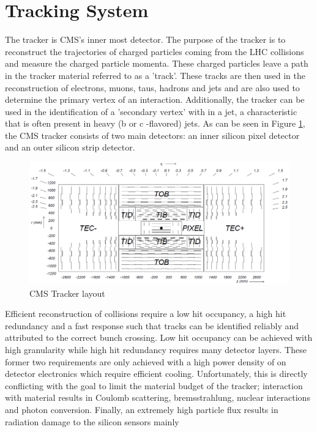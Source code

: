 \section{Tracking System}
The tracker is CMS's inner most detector. The purpose of the 
tracker is to reconstruct the trajectories of charged particles 
coming from the LHC collisions and measure the charged particle momenta.
These charged particles leave a path in the tracker material referred to as a 'track'.%
These tracks are then used in the reconstruction of electrons, muons, taus, hadrons and jets 
and are also used to determine the primary vertex of an interaction. Additionally,
the tracker can be used in the identification of a 'secondary vertex' with in a jet,
a characteristic that is often present
in heavy (b or c -flavored) jets.
As can be seen in Figure \ref{fig:trackerLayout}, the CMS tracker consists of two main 
detectors: an inner silicon pixel detector and an outer silicon strip detector.
\begin{figure}[hb]
  \centering
	\includegraphics[width=1\textwidth]{trackerImages/trackerLayout.png}
  	\caption[CMS Tracker Layout]
   	{CMS Tracker layout}
	\label{fig:trackerLayout}
\end{figure}
Efficient reconstruction of collisions require a low hit occupancy, a high hit redundancy and a
fast response such that tracks can be identified reliably and attributed to the correct bunch crossing.
Low hit occupancy can be achieved with high granularity while high hit redundancy requires
many detector layers. These former two requirements are only achieved with a 
high power density of on detector electronics which require efficient cooling. 
Unfortunately, this is directly conflicting with the goal to limit the material 
budget of the tracker; interaction with material results in Coulomb scattering,
bremsstrahlung, nuclear interactions and photon conversion. Finally, an extremely
high particle flux results in radiation damage to the silicon sensors mainly 
